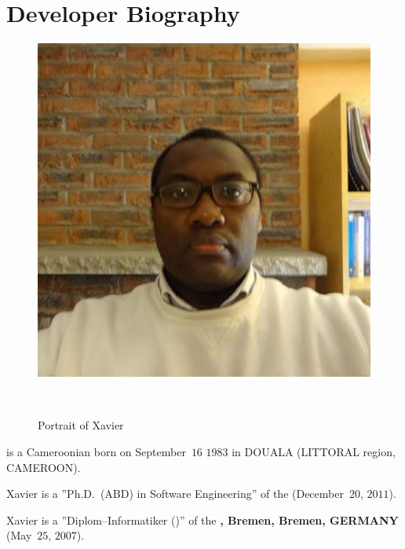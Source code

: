 \section{Developer Biography}\label{chap:biography}
\vspace{-0.9em}
\begin{figure}[!htpb]
\centering
\includegraphics[scale=0.35]{../../francais/images/XavierNOUNDOU-2}
\caption{Portrait of Xavier}~\label{fig:xaviernoumbis}
\end{figure}

\textbf{\myfullacademicname} is a Cameroonian
born on September~$16$ $1983$ in DOUALA (LITTORAL region, CAMEROON).

Xavier is a ''Ph.D.~(ABD) in Software Engineering''
of the  
(December~$20$, $2011$).

Xavier is a ''Diplom--Informatiker (\diplinf)'' of
the \textbf{\unibremen, Bremen, Bremen, GERMANY} (May~$25$, $2007$).
